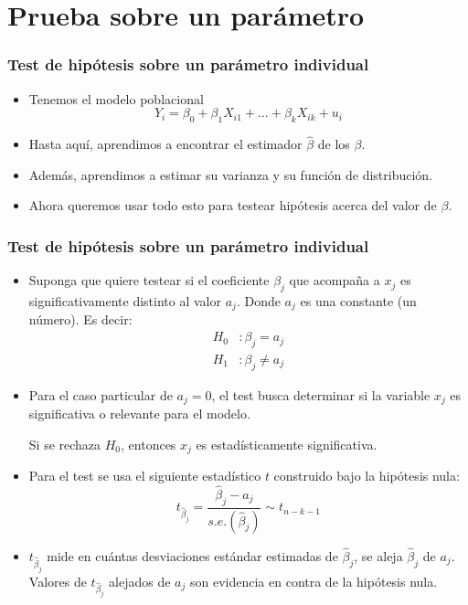 \documentclass{beamer}
\begin{document}
\section{Prueba sobre un parámetro}

\begin{frame}[shrink=10]
\frametitle{Test de hipótesis sobre un parámetro individual}
\begin{itemize}
    \item Tenemos el modelo poblacional
    $$Y_i = \beta_0 + \beta_1X_{i1} + \ldots + \beta_kX_{ik} + u_i$$
    \item Hasta aquí, aprendimos a encontrar el estimador $\hat{\beta}$ de los $\beta$.
    \item Además, aprendimos a estimar su varianza y su función de distribución.
    \item Ahora queremos usar todo esto para testear hipótesis acerca del valor de $\beta$.

\end{itemize}
\end{frame}

\begin{frame}[shrink=10]
\frametitle{Test de hipótesis sobre un parámetro individual}
\begin{itemize}
    \item Suponga que quiere testear si el coeficiente $\beta_j$ que acompaña a $x_j$ es significativamente distinto al valor $a_j$. Donde $a_j$ es una constante (un número). Es decir:
    \begin{align*}
        H_0 &: \beta_j = a_j \\
        H_1 &: \beta_j \neq a_j
    \end{align*}
    \item {\color{red} Para el caso particular de $a_j = 0$, el test busca determinar si la variable $x_j$ es significativa o relevante para el modelo.

     Si se rechaza $H_0$, entonces $x_j$ es estadísticamente significativa.}

    \item Para el test se usa el siguiente estadístico $t$ construido bajo la hipótesis nula:
    $$t_{\hat{\beta}_j} = \frac{\hat{\beta}_j - a_j}{s.e.(\hat{\beta}_j)} \sim t_{n-k-1}$$
    \item $t_{\hat{\beta}_j}$ mide en cuántas desviaciones estándar estimadas de $\hat{\beta}_j$, se aleja $\hat{\beta}_j$ de $a_j$. Valores de $t_{\hat{\beta}_j}$ alejados de $a_j$ son evidencia en contra de la hipótesis nula.
\end{itemize}
\end{frame}
\end{document}
